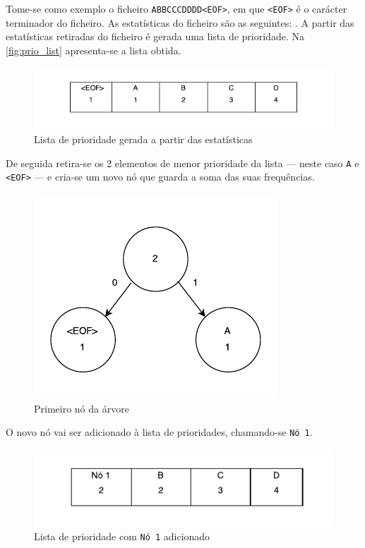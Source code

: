 Tome-se como exemplo o ficheiro \texttt{ABBCCCDDDD<EOF>}, em que \texttt{<EOF>} é o carácter terminador do ficheiro. As estatísticas do ficheiro são as seguintes: \texttt{}. A partir das estatísticas retiradas do ficheiro é gerada uma lista de prioridade. Na \autoref{fig:prio_list} apresenta-se a lista obtida.

\begin{figure}[H]
  \centering
  \includegraphics[width=.75\textwidth]{img/prio_list}
  \caption{Lista de prioridade gerada a partir das estatísticas}
  \label{fig:prio_list}
\end{figure}

De seguida retira-se os 2 elementos de menor prioridade da lista --- neste caso \texttt{A} e \texttt{<EOF>} --- e cria-se um novo nó que guarda a soma das suas frequências.

\begin{figure}[H]
  \centering
  \includegraphics[width=.5\textwidth]{img/trie_1}
  \caption{Primeiro nó da árvore}
  \label{fig:trie_1}
\end{figure}

O novo nó vai ser adicionado à lista de prioridades, chamando-se \texttt{Nó 1}.

\begin{figure}[H]
  \centering
  \includegraphics[width=.65\textwidth]{img/prio_list_2}
  \caption{Lista de prioridade com \texttt{Nó 1} adicionado}
  \label{fig:prio_list_2}
\end{figure}

